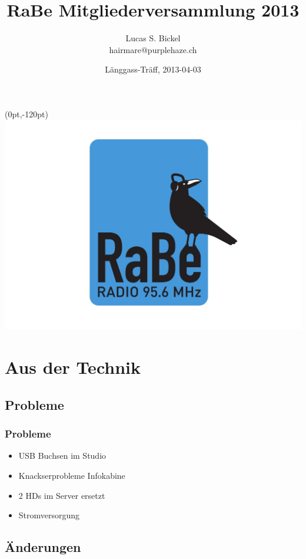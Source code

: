 \documentclass{beamer}
\title[RaBe Technik-Gruppe]{RaBe Mitgliederversammlung 2013}
\author{Lucas S. Bickel\\{ hairmare@purplehaze.ch}}
\institute[]{Radio Bern, Technik-Gruppe}
\date[DLT 2012]{L\"anggass-Tr\"aff, 2013-04-03}
\begin{document}
  \bgroup
  \begin{frame}[plain]{}
  \end{frame}
  \egroup

  \frame
  {

    \titlepage

    \begin{textblock*}{200pt}(0pt,-120pt)
      \scalebox{0.175}
      {
        \includegraphics[trim = 200pt 0pt 155pt 0pt,clip]{img/logo.png}
      }
    \end{textblock*}
  }

  \section*{Aus der Technik}

  \subsection*{Probleme}

  \frame
  {
    \frametitle{Probleme}
    
    \begin{itemize}[<+->]
    \item{USB Buchsen im Studio}
    \item{Knackserprobleme Infokabine}
    \item{2 HDs im Server ersetzt}
    \item{Stromversorgung}
    \end{itemize}
  }

  \subsection*{\"Anderungen}
\end{document}

